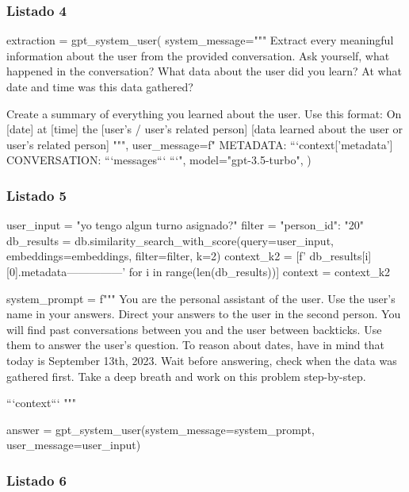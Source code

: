 \subsubsection{Listado 4}
\label{anexo:code-4-1-16-4}

\begin{APACode}
extraction = gpt_system_user(
    system_message="""
    Extract every meaningful information about the user from the provided conversation. 
    Ask yourself, what happened in the conversation?
    What data about the user did you learn?
    At what date and time was this data gathered?

    Create a summary of everything you learned about the user. Use this format:
    On [date] at [time] the [user's / user's related person] [data learned about the user or user's related person]
    """,
    user_message=f" METADATA: ```{context['metadata']} CONVERSATION: ```{messages}``` ```", 
    model="gpt-3.5-turbo",
)
\end{APACode}

\subsubsection{Listado 5}
\label{anexo:code-4-1-16-5}

\begin{APACode}
user_input = "yo tengo algun turno asignado?" 
filter = {"person_id": "20"}
db_results = db.similarity_search_with_score(query=user_input, embeddings=embeddings, filter=filter, k=2)
context_k2 = [f' {db_results[i][0].metadata}\n---------------\n\n' for i in range(len(db_results))]
context = context_k2

system_prompt = f"""
You are the personal assistant of the user. Use the user's name in your answers.
Direct your answers to the user in the second person.
You will find past conversations between you and the user between backticks. Use them to answer the user's question.
To reason about dates, have in mind that today is September 13th, 2023. Wait before answering, check when the data was gathered first.
Take a deep breath and work on this problem step-by-step.

```{context}``` """

answer = gpt_system_user(system_message=system_prompt, user_message=user_input)
\end{APACode}

\subsubsection{Listado 6}
\label{anexo:code-4-1-16-6}

